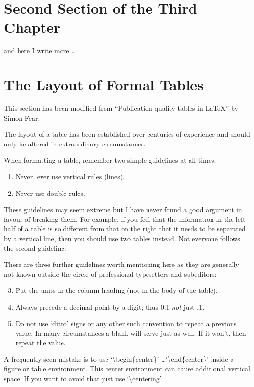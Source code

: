 \section{Second Section of the Third Chapter}
and here I write more \dots

\section{The Layout of Formal Tables}
This section has been modified from ``Publication quality tables in \LaTeX*''
by Simon Fear.

The layout of a table has been established over centuries of experience and
should only be altered in extraordinary circumstances.

When formatting a table, remember two simple guidelines at all times:

\begin{enumerate}
  \item Never, ever use vertical rules (lines).
  \item Never use double rules.
\end{enumerate}

These guidelines may seem extreme but I have
never found a good argument in favour of breaking them. For
example, if you feel that the information in the left half of
a table is so different from that on the right that it needs
to be separated by a vertical line, then you should use two
tables instead. Not everyone follows the second guideline:

There are three further guidelines worth mentioning here as they
are generally not known outside the circle of professional
typesetters and subeditors:

\begin{enumerate}\setcounter{enumi}{2}
  \item Put the units in the column heading (not in the body of
        the table).
  \item Always precede a decimal point by a digit; thus 0.1
          {\em not} just .1.
  \item Do not use `ditto' signs or any other such convention to
        repeat a previous value. In many circumstances a blank
        will serve just as well. If it won't, then repeat the value.
\end{enumerate}

A frequently seen mistake is to use `\textbackslash begin\{center\}' \dots `\textbackslash end\{center\}' inside a figure or table environment. This center environment can cause additional vertical space. If you want to avoid that just use `\textbackslash centering'


